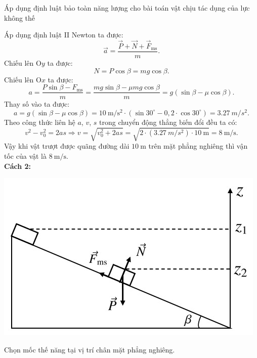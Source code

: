 \begin{dang}{Áp dụng định luật bảo toàn năng lượng cho bài toán vật chịu tác dụng của lực không thế}
{{\begin{itemize}
			\end{itemize}
			Áp dụng định luật II Newton ta được:
			\begin{equation*}
				\vec{a}=\dfrac{\vec{P}+\vec{N}+\vec{F}_\text{ms}}{m}.
			\end{equation*}
			Chiếu lên O$y$ ta được:
			\begin{equation*}
				N = P\cos\beta = mg\cos\beta.
			\end{equation*}
			Chiếu lên O$x$ ta được:
			\begin{equation*}
				a=\dfrac{P\sin\beta-F_\text{ms}}{m}=\dfrac{mg\sin\beta-\mu mg\cos\beta}{m}=g(\sin\beta-\mu\cos\beta).
			\end{equation*}
			Thay số vào ta được:
			\begin{equation*}
				a=g(\sin\beta-\mu\cos\beta)=\SI{10}{\meter/\second^2}\cdot (\sin30^\circ-0,2\cdot\cos30^\circ)=\SI{3,27}{m/s^2}.
			\end{equation*}
			Theo công thức liên hệ $a$, $v$, $s$ trong chuyển động thẳng biến đổi đều ta có:
			\begin{equation*}
				v^2-v_0^2=2as\Rightarrow v=\sqrt{v_0^2+2as}=\sqrt{2\cdot \left(\SI{3,27}{m/s^2}\right)\cdot \SI{10}{\meter}}= \SI{8}{\meter/\second}.
			\end{equation*}
			Vậy khi vật trượt được quãng đường dài $\SI{10}{\meter}$ trên mặt phẳng nghiêng thì vận tốc của vật là $\SI{8}{\meter/\second}$.\\
			\textbf{Cách 2:}\\
			\begin{center}
				\includegraphics[scale=0.5]{../figs/VN10-PH-33-L-025-3-H3.jpg}
			\end{center}
			Chọn mốc thế năng tại vị trí chân mặt phẳng nghiêng.\\
}}
\end{dang}
